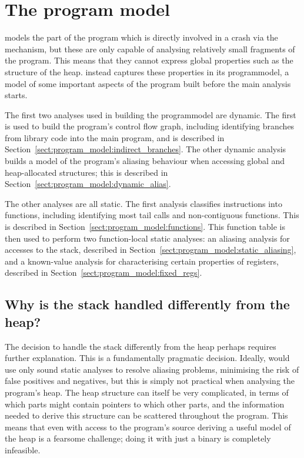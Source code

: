\chapter{The program model}
\label{sect:program_model}

{\Technique} models the part of the program which is directly involved
in a crash via the {\StateMachine} mechanism, but these are only
capable of analysing relatively small fragments of the program.  This
means that they cannot express global properties such as the structure
of the heap.  {\Technique} instead captures these properties in its
\gls{programmodel}, a model of some important aspects of the program
built before the main analysis starts.

The first two analyses used in building the \gls{programmodel} are
dynamic.  The first is used to build the program's control flow graph,
including identifying branches from library code into the main
program, and is described in
Section~\ref{sect:program_model:indirect_branches}.  The other dynamic
analysis builds a model of the program's aliasing behaviour when
accessing global and heap-allocated structures; this is described in
Section~\ref{sect:program_model:dynamic_alias}.

The other analyses are all static.  The first analysis classifies
instructions into functions, including identifying most tail calls and
non-contiguous functions. This is described in
Section~\ref{sect:program_model:functions}.  This function table is
then used to perform two function-local static analyses: an aliasing
analysis for accesses to the stack, described in
Section~\ref{sect:program_model:static_aliasing}, and a known-value
analysis for characterising certain properties of registers, described
in Section~\ref{sect:program_model:fixed_regs}.

\section{Why is the stack handled differently from the heap?}

The decision to handle the stack differently from the heap perhaps
requires further explanation.  This is a fundamentally pragmatic
decision.  Ideally, {\technique} would use only sound static analyses
to resolve aliasing problems, minimising the risk of false positives
and negatives, but this is simply not practical when analysing the
program's heap.  The heap structure can itself be very complicated, in
terms of which parts might contain pointers to which other parts, and
the information needed to derive this structure can be scattered
throughout the program.  This means that even with access to the
program's source deriving a useful model of the heap is a fearsome
challenge\cite{Wilhelm2000}; doing it with just a binary is completely
infeasible.

